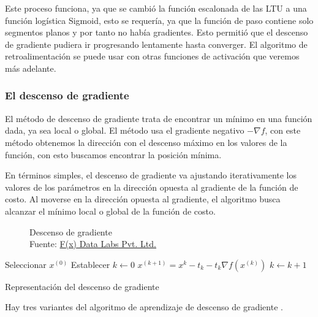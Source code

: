 Este proceso funciona, ya que se cambió la función escalonada de las \gls{LTU} a una función logística Sigmoid, esto se requería, ya que la función de paso contiene solo segmentos planos y por tanto no había gradientes. Esto permitió que el descenso de gradiente pudiera ir progresando lentamente hasta converger. El algoritmo de retroalimentación se puede usar con otras funciones de activación que veremos más adelante.


\subsubsection{El descenso de gradiente\label{sec:gradient-descent}}

El método de descenso de gradiente trata de encontrar un mínimo en una función dada, ya sea local o global. El método usa el gradiente negativo ${-\nabla{f}}$, con este método obtenemos la dirección con el descenso máximo en los valores de la función, con esto buscamos encontrar la posición mínima.

En términos simples, el descenso de gradiente va ajustando iterativamente los valores de los parámetros en la dirección opuesta al gradiente de la función de costo. Al moverse en la dirección opuesta al gradiente, el algoritmo busca alcanzar el mínimo local o global de la función de costo.

\begin{figure}[H]
    \centering
    \centerline{}
    \caption{Descenso de gradiente\\Fuente: \href{https://fxdatalabs.com}{F(x) Data Labs Pvt. Ltd.}}
    \label{fig:gradient-descent}
\end{figure}

\begin{algorithm}[H]
    \SetAlgoLined
    \DontPrintSemicolon
    Seleccionar $x^{(0)}$\;
    Establecer $k \leftarrow 0$\;
     {
        $x^{(k+1)} = x^{k} - t_{k} - t_{k} \nabla f(x^{(k)})$\;
        $k \leftarrow k + 1$\;
    }
    \;
    \label{alg:plot-gradient-descent}
    \caption{Representación del descenso de gradiente}
\end{algorithm}

Hay tres variantes del algoritmo de aprendizaje de descenso de gradiente \cite{ibm-gradient-descent}.

